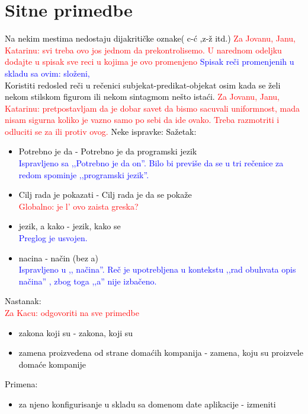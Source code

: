 \documentclass[a4paper]{report}
\newcommand{\odgovor}[1]{\textcolor{black}{#1}}
\newcommand{\odgovorAutora}[1]{\textcolor{blue}{#1}}
\newcommand{\note}[1]{\textcolor{red}{#1}}
\begin{document}
\section{Sitne primedbe}
\odgovor{
Na nekim mestima nedostaju dijakritičke oznake( c-ć ,z-ž itd.)
\note{Za Jovanu, Janu, Katarinu: svi treba ovo jos jednom da prekontrolisemo. U narednom odeljku dodajte u spisak sve reci u kojima je ovo promenjeno} \odgovorAutora{Spisak reči promenjenih u skladu sa ovim: složeni, } \\
Koristiti redosled reči u rečenici subjekat-predikat-objekat osim kada se želi nekom stilskom figurom ili nekom sintagmom nešto istaći.
\note{Za Jovanu, Janu, Katarinu: pretpostavljam da je dobar savet da bismo sacuvali uniformnost, mada nisam sigurna koliko je vazno samo po sebi da ide ovako. Treba razmotriti i odluciti se za ili protiv ovog.}\newline
Neke ispravke:\newline
Sažetak:
\begin{itemize}
  \item Potrebno je da - Potrebno je da programski jezik \\
  \odgovorAutora{Ispravljeno sa ,,Potrebno je da on''. Bilo bi previše da se u tri rečenice za redom spominje ,,programski jezik''.}
  \item Cilj rada je pokazati - Cilj rada je da se pokaže \\
  \note{Globalno: je l' ovo zaista greska?}
  \item  jezik, a kako  -  jezik, kako se \\
  \odgovorAutora{Preglog je usvojen.}
  \item  nacina - način (bez a) \\
  \odgovorAutora{Ispravljeno u ,, načina''. Reč je upotrebljena u kontekstu ,,rad obuhvata opis načina'' , zbog toga ,,a'' nije izbačeno.}
\end{itemize}
Nastanak: \\
\note{Za Kacu: odgovoriti na sve primedbe} 
\begin{itemize}
  \item zakona koji su - zakona, koji su
  \item zamena proizvedena od strane domaćih kompanija - zamena, koju su proizvele domaće kompanije
\end{itemize}
Primena:  
\begin{itemize}
  \item za njeno konfigurisanje u skladu sa domenom date aplikacije - izmeniti

\end{itemize}}
\end{document}
